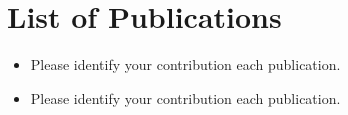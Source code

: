 \chapter*{List of Publications}

\begin{itemize}
    \item {}

	Please identify your contribution each publication.

    \item {}

	Please identify your contribution each publication.
\end{itemize}
